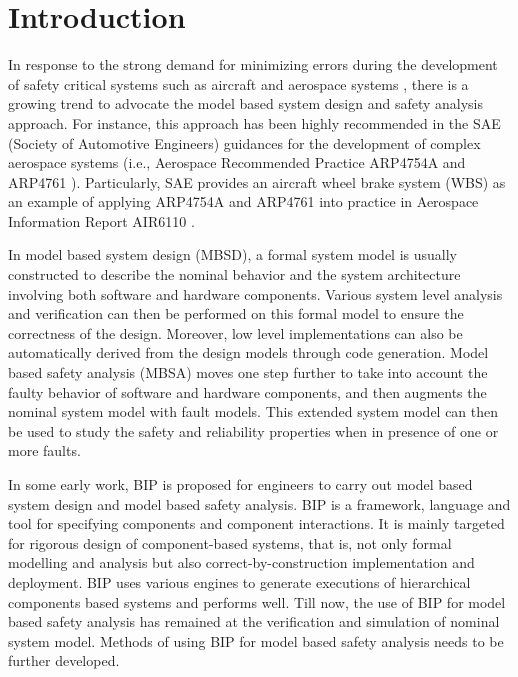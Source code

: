 
\section{Introduction}

In response to the strong demand for minimizing errors during the development of safety critical systems such as aircraft and aerospace systems \cite{lctes10,issrew12},
  there is a growing trend to advocate the model based system design and safety analysis approach.
  For instance,  this approach has been highly recommended in the SAE (Society of Automotive Engineers) guidances for the development of complex aerospace systems 
  (i.e., Aerospace Recommended Practice ARP4754A \cite{arp4754a} and ARP4761 \cite{arp4761}).
  Particularly, SAE provides an aircraft wheel brake system (WBS) as an example of applying ARP4754A and ARP4761 into practice 
  in Aerospace Information Report AIR6110 \cite{air6110}.

 In model based system design (MBSD),
 a formal system model is usually constructed to describe the nominal behavior and the system architecture involving both software and hardware components.
 Various system level analysis and verification can then be performed on this formal model to ensure the correctness of the design.
 Moreover, low level implementations can also be automatically derived from the design models through code generation.
 Model based safety analysis (MBSA) moves one step further to take into account the faulty behavior of software and hardware components,
 and then augments the nominal system model with fault models.
 This extended system model can then be used to study the safety and reliability properties when  in presence of one or more faults.

In some early work\cite{bip1,bip2}, BIP is proposed for engineers to carry out model based system design and model based safety analysis.
BIP is a framework, language and tool for specifying components and component interactions.
It is mainly targeted for rigorous design of component-based systems, that is, not only formal modelling and analysis but also correct-by-construction implementation and deployment.
BIP uses various engines to generate executions of hierarchical components based systems and performs well.
Till now, the use of BIP for model based safety analysis has remained at the verification and simulation of nominal system model.
Methods of using BIP for model based safety analysis needs to be further developed.

\begin{comment}
BIP also provides a type definition for each component and graphical representation for BIP model to decrease the complexity of system design.
\end{comment}

